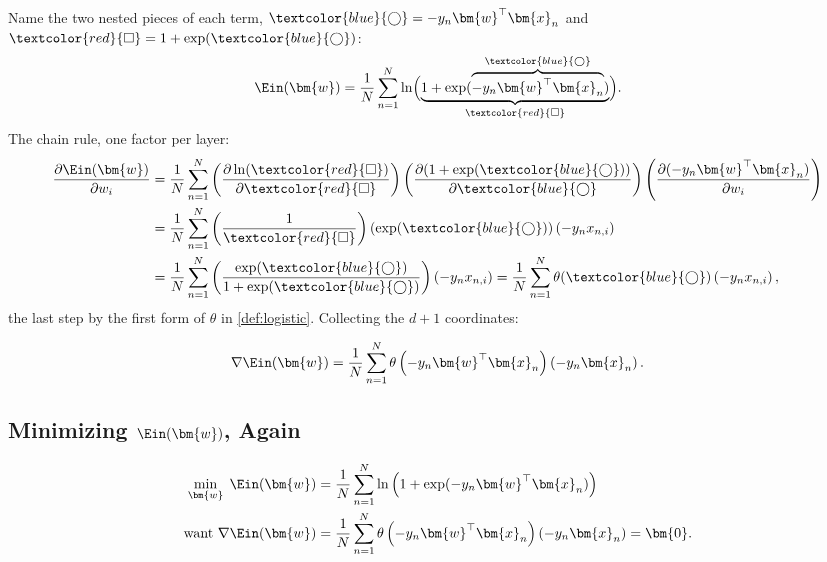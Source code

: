 Name the two nested pieces of each term, \(\textcolor{blue}{\bigcirc} =
-y_n \bm{w}^\top \bm{x}_n\) and \(\textcolor{red}{\square} = 1 +
\exp(\textcolor{blue}{\bigcirc})\):
\[
    \Ein(\bm{w}) = \frac{1}{N} \sum_{n=1}^N \ln \Bigl(
    \underbrace{1 + \exp(\overbrace{-y_n \bm{w}^\top
    \bm{x}_n}^{\textcolor{blue}{\bigcirc}})}_{\textcolor{red}{\square}}
    \Bigr) .
\]
The chain rule, one factor per layer:
\begin{align*}
    \frac{\partial \Ein(\bm{w})}{\partial w_i}
    &= \frac{1}{N} \sum_{n=1}^N
    \left( \frac{\partial \ln(\textcolor{red}{\square})}{\partial
    \textcolor{red}{\square}} \right)
    \left( \frac{\partial (1 + \exp(\textcolor{blue}{\bigcirc}))}{\partial
    \textcolor{blue}{\bigcirc}} \right)
    \left( \frac{\partial (-y_n \bm{w}^\top \bm{x}_n)}{\partial w_i}
    \right)\\
    &= \frac{1}{N} \sum_{n=1}^N
    \left( \frac{1}{\textcolor{red}{\square}} \right)
    \left( \exp(\textcolor{blue}{\bigcirc}) \right)
    \left( -y_n x_{n,i} \right)\\
    &= \frac{1}{N} \sum_{n=1}^N
    \left( \frac{\exp(\textcolor{blue}{\bigcirc})}{1 +
    \exp(\textcolor{blue}{\bigcirc})} \right)
    \left( -y_n x_{n,i} \right)
    = \frac{1}{N} \sum_{n=1}^N \theta(\textcolor{blue}{\bigcirc})
    \left( -y_n x_{n,i} \right) ,
\end{align*}
the last step by the first form of \(\theta\) in \autoref{def:logistic}.
Collecting the \(d + 1\) coordinates:

\begin{moral}
    \begin{equation}\label{eq:lr-grad}
        \nabla \Ein(\bm{w}) = \frac{1}{N} \sum_{n=1}^N \theta \left( -y_n
        \bm{w}^\top \bm{x}_n \right) \left( -y_n \bm{x}_n \right) .
    \end{equation}
\end{moral}

\subsection{Minimizing \texorpdfstring{\(\Ein(\bm{w})\)}{Ein(w)}, Again}

\begin{align*}
    \min_{\bm{w}} \; \Ein(\bm{w}) &= \frac{1}{N} \sum_{n=1}^N \ln \left( 1 +
    \exp(-y_n \bm{w}^\top \bm{x}_n) \right)\\
    \text{want } \nabla \Ein(\bm{w}) &= \frac{1}{N} \sum_{n=1}^N \theta \left(
    -y_n \bm{w}^\top \bm{x}_n \right) \left( -y_n \bm{x}_n \right) =
    \bm{0} .
\end{align*}

